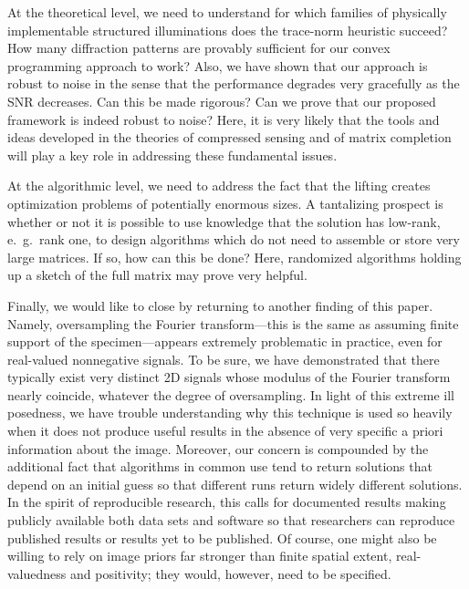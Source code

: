\documentclass[11pt]{article}
\newcommand{\<}{\langle}
\renewcommand{\>}{\rangle}
\numberwithin{equation}{section}
\begin{document}
At the theoretical level, we need to understand for which families of
physically implementable structured illuminations does the trace-norm
heuristic succeed? How many diffraction patterns are provably
sufficient for our convex programming approach to work? Also, we have
shown that our approach is robust to noise in the sense that the
performance degrades very gracefully as the SNR decreases. Can this be
made rigorous? Can we prove that our proposed framework is indeed
robust to noise? Here, it is very likely that the tools and ideas
developed in the theories of compressed sensing and of matrix
completion will play a key role in addressing these fundamental
issues.

At the algorithmic level, we need to address the fact that the lifting
creates optimization problems of potentially enormous sizes. A
tantalizing prospect is whether or not it is possible to use
knowledge that the solution has low-rank, e.~g.~rank one, to design
algorithms which do not need to assemble or store very large matrices.
If so, how can this be done? Here, randomized algorithms holding up a
sketch of the full matrix may prove very helpful.

Finally, we would like to close by returning to another finding of
this paper. Namely, oversampling the Fourier transform---this is the
same as assuming finite support of the specimen---appears extremely
problematic in practice, even for real-valued nonnegative signals. To
be sure, we have demonstrated that there typically exist very distinct
2D signals whose modulus of the Fourier transform nearly coincide,
whatever the degree of oversampling. In light of this extreme ill
posedness, we have trouble understanding why this technique is used so
heavily when it does not produce useful results in the absence of
very specific a priori information about the image.
Moreover, our concern is compounded by the additional fact
that algorithms in common use tend to return solutions that depend on
an initial guess so that different runs return widely different
solutions.  In the spirit of reproducible research, this calls for
documented results making publicly available both data sets and
software so that researchers can reproduce published results or
results yet to be published.  Of course, one might also be willing to
rely on image priors far stronger than finite spatial extent,
real-valuedness and positivity; they would, however, need to be
specified. 
 
\end{document}
